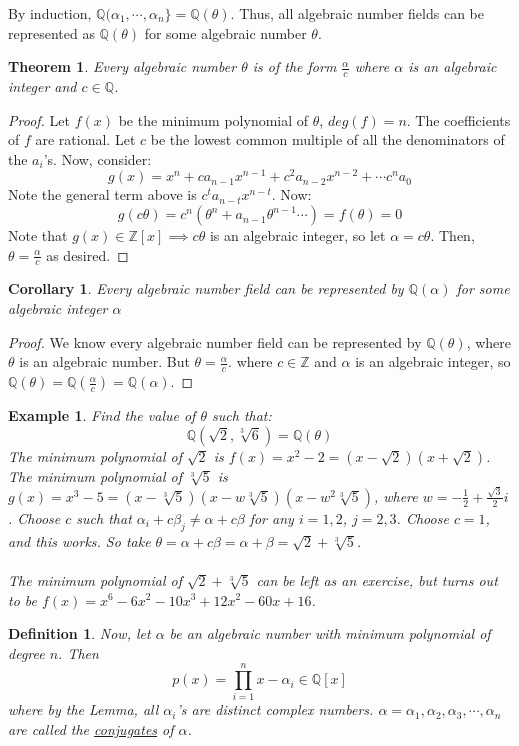 \documentclass{article}
\newcommand{\Q}{\mathbb{Q}}
\newcommand{\Z}{\mathbb{Z}}
\newtheorem{theorem}{Theorem}[subsection]
\newtheorem{cor}{Corollary}[subsection]
\newtheorem{example}{Example}[subsection]
\newtheorem{definition}{Definition}[subsection]
\begin{document}
\noindent By induction, $\Q(\alpha_1,\cdots, \alpha_n\}=\Q(\theta)$. Thus, all algebraic number fields can be represented as $\Q(\theta)$ for some algebraic number $\theta$.
\newpage
\begin{theorem}
Every algebraic number $\theta$ is of the form $\frac{\alpha}{c}$ where $\alpha$ is an algebraic integer and $c\in \Q$. 
\end{theorem}
\begin{proof}
Let $f(x)$ be the minimum polynomial of $\theta$, $deg(f)=n$. The coefficients of $f$ are rational. Let $c$ be the lowest common multiple of all the denominators of the $a_i$'s. Now, consider:
$$g(x)=x^n+ca_{n-1}x^{n-1}+c^2a_{n-2}x^{n-2}+\cdots c^na_0$$
Note the general term above is $c^ta_{n-t}x^{n-t}$. Now:
$$g(c\theta) = c^n(\theta^n+a_{n-1}\theta^{n-1}\cdots ) = f(\theta)=0$$
Note that $g(x)\in\Z[x]\implies c\theta$ is an algebraic integer, so let $\alpha=c\theta$. Then, $\theta=\frac{\alpha}{c}$ as desired.
\end{proof}
\begin{cor}
Every algebraic number field can be represented by $\Q(\alpha)$ for some algebraic integer $\alpha$
\end{cor}
\begin{proof}
We know every algebraic number field can be represented by $\Q(\theta)$, where $\theta$ is an algebraic number. But $\theta=\frac{\alpha}{c}$. where $c\in\Z$ and $\alpha$ is an algebraic integer, so $\Q(\theta)=\Q(\frac{\alpha}{c})=\Q(\alpha)$.
\end{proof}
\begin{example}
Find the value of $\theta$ such that:
$$\Q(\sqrt{2},\sqrt[3]{6}) = \Q(\theta)$$
The minimum polynomial of $\sqrt{2}$ is $f(x)=x^2-2=(x-\sqrt{2})(x+\sqrt{2})$. The minimum polynomial of $\sqrt[3]{5}$ is $g(x)=x^3-5=(x-\sqrt[3]{5})(x-w\sqrt[3]{5})(x-w^2\sqrt[3]{5})$, where $w=-\frac{1}{2}+\frac{\sqrt{3}}{2}i$. Choose $c$ such that $\alpha_i+c\beta_j\neq \alpha+c\beta$ for any $i=1,2$, $j=2,3$. Choose $c=1$, and this works. So take $\theta=\alpha+c\beta = \alpha+\beta =\sqrt{2}+\sqrt[3]{5}$.\\
\\
The minimum polynomial of $\sqrt{2}+\sqrt[3]{5}$ can be left as an exercise, but turns out to be $f(x)=x^6-6x^2-10x^3+12x^2-60x+16$.
\end{example}
\begin{definition}
Now, let $\alpha$ be an algebraic number with minimum polynomial of degree $n$. Then $$p(x)=\displaystyle\prod_{i=1}^nx-\alpha_i \in \Q[x]$$ where by the Lemma, all $\alpha_i$'s are distinct complex numbers. $\alpha=\alpha_1, \alpha_2,\alpha_3,\cdots, \alpha_n$ are called the \underline{conjugates} of $\alpha$.
\end{definition}
\end{document}
